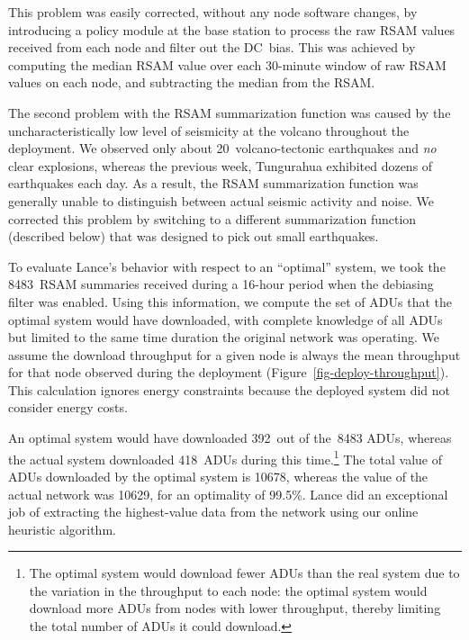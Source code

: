 This problem was easily corrected, without any node software changes,
by introducing a policy module at the base station to process the 
raw RSAM values received
from each node and filter out the DC~bias. This was achieved by
computing the median RSAM value over each 30-minute window of raw RSAM
values on each node, and subtracting the median from the RSAM.

The second problem with the RSAM summarization function was caused
by the uncharacteristically low level of seismicity at the volcano
throughout the deployment. We observed only about 20~volcano-tectonic 
earthquakes and {\em no} clear explosions, whereas the previous week,
Tungurahua exhibited dozens of earthquakes each day. As a result, the
RSAM summarization function was generally unable to distinguish between
actual seismic activity and noise. We corrected this problem by
switching to a different summarization function (described below)
that was designed to pick out small earthquakes. 

To evaluate Lance's behavior with respect to an ``optimal'' system, we took
the 8483~RSAM summaries received during a 16-hour period when the debiasing
filter was enabled. Using this information, we compute the set of ADUs that
the optimal system would have downloaded, with complete knowledge of all ADUs
but limited to the same time duration the original network was operating.  We
assume the download throughput for a given node is always the mean throughput
for that node observed during the deployment
  (Figure~\ref{fig-deploy-throughput}). This calculation ignores energy
  constraints because the deployed system did not consider energy costs.


An optimal system would have downloaded 392~out of the~8483 ADUs,
whereas the actual system downloaded 418~ADUs during this 
time.\footnote{The optimal system would download fewer ADUs 
than the real system due to the variation in the throughput to each 
node: the optimal system would download more ADUs from nodes 
with lower throughput, thereby limiting the total number of ADUs it could
download.} The total value of ADUs downloaded by the optimal system 
is 10678, whereas the value of the actual network was 10629, for an
optimality of 99.5\%. Lance did an exceptional job of extracting the
highest-value data from the network using our online heuristic
algorithm.

